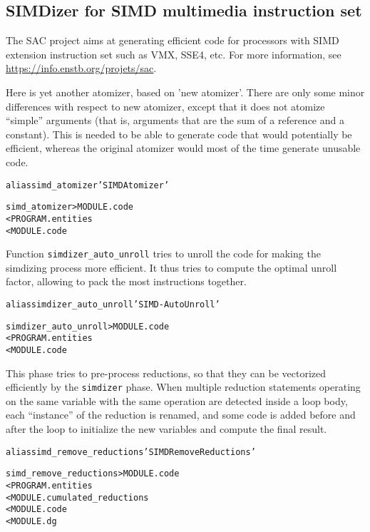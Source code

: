 \documentclass[a4paper]{report}
\newenvironment{PipsMake}{\begin{alltt}}{\end{alltt}}
\begin{document}
\subsection{SIMDizer for SIMD multimedia instruction set}

The SAC project aims at generating efficient code for processors with SIMD
extension instruction set such as VMX, SSE4, etc. For more information,
see \url{https://info.enstb.org/projets/sac}.

Here is yet another atomizer, based on 'new atomizer'. There are only
some minor differences with respect to new atomizer, except that it
does not atomize ``simple'' arguments (that is, arguments that are the
sum of a reference and a constant). This is needed to be able to
generate code that would potentially be efficient, whereas the
original atomizer would most of the time generate unusable code.

\begin{PipsMake}
alias simd_atomizer 'SIMD Atomizer'

simd_atomizer                      > MODULE.code
        < PROGRAM.entities
        < MODULE.code
\end{PipsMake}

Function \verb+simdizer_auto_unroll+ tries to unroll the code for
making the simdizing process more efficient. It thus tries to compute
the optimal unroll factor, allowing to pack the most instructions together.

\begin{PipsMake}
alias simdizer_auto_unroll 'SIMD-Auto Unroll'

simdizer_auto_unroll        > MODULE.code
        < PROGRAM.entities
        < MODULE.code
\end{PipsMake}

This phase tries to pre-process reductions, so that they can be
vectorized efficiently by the \verb+simdizer+ phase. When multiple
reduction statements operating on the same variable with the same
operation are detected inside a loop body, each ``instance'' of the
reduction is renamed, and some code is added before and after the loop
to initialize the new variables and compute the final result.

\begin{PipsMake}
alias simd_remove_reductions 'SIMD Remove Reductions'

simd_remove_reductions      > MODULE.code
        < PROGRAM.entities
        < MODULE.cumulated_reductions
        < MODULE.code
        < MODULE.dg
\end{PipsMake}
\end{document}
